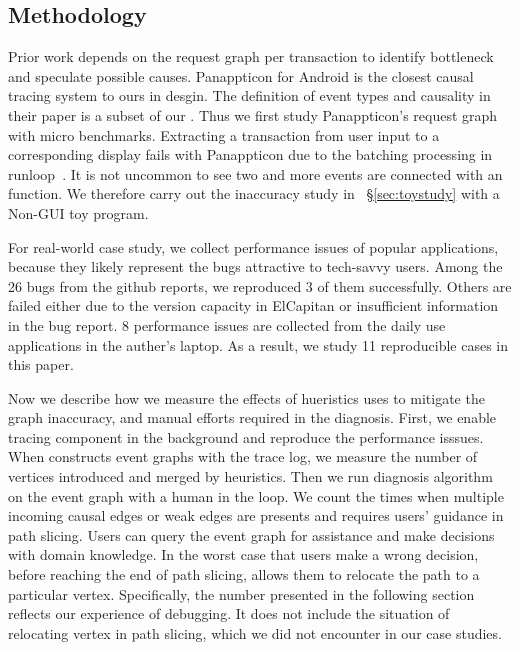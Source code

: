 \subsection{Methodology} \label{sec:methodology}


Prior work depends on the request graph per transaction to identify bottleneck
and speculate possible causes. Panappticon for Android is the closest causal
tracing system to ours in desgin. The definition of event types and causality in
their paper is a subset of our \xxx. Thus we first study Panappticon's request
graph with micro benchmarks. Extracting a transaction from user input to a
corresponding display fails with Panappticon due to the batching processing in
runloop~\cite{runloop}. It is not uncommon to see two and more  events
are connected with an  function. We therefore
carry out the inaccuracy study in ~\S\ref{sec:toystudy} with a Non-GUI toy
program.

For real-world case study, we collect performance issues of popular
applications, because they likely represent the bugs attractive to tech-savvy
users. Among the 26 bugs from the github reports, we reproduced 3 of them
successfully. Others are failed either due to the version capacity in ElCapitan
or insufficient information in the bug report. 8 performance issues are
collected from the daily use applications in the auther's laptop. As a result,
we study 11 reproducible cases in this paper.


Now we describe how we measure the effects of hueristics \xxx uses to
mitigate the graph inaccuracy, and manual efforts required in the diagnosis.
First, we enable tracing component in the background and reproduce the
performance isssues.  When \xxx constructs event graphs with the trace log, we
measure the number of vertices introduced and merged by heuristics.  Then we
run \xxx diagnosis algorithm on the event graph with a human in the loop. We
count the times when multiple incoming causal edges or weak edges are presents
and \xxx requires users' guidance in path slicing. Users can query the event
graph for assistance and make decisions with domain knowledge. In the worst
case that users make a wrong decision, before reaching the end of path slicing,
\xxx allows them to relocate the path to a particular vertex. Specifically, the
number presented in the following section reflects our experience of debugging.
It does not include the situation of relocating vertex in path slicing, which
we did not encounter in our case studies.

